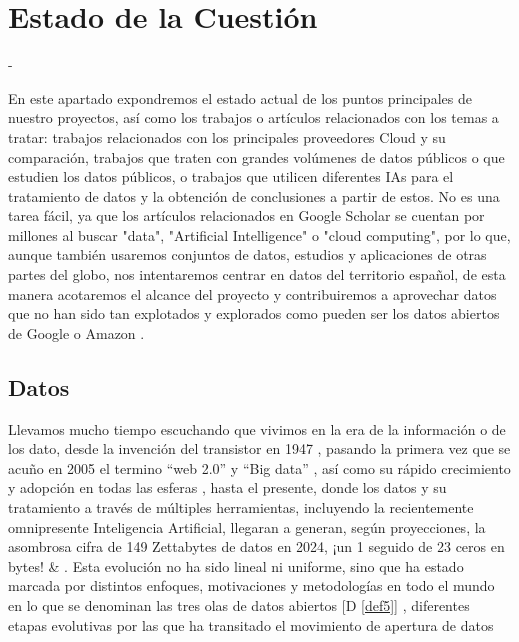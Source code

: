 \chapter{Estado de la Cuestión}
\label{cap:estadoDeLaCuestion}


-

En este apartado expondremos el estado actual de los puntos principales de nuestro proyectos, así como los trabajos o artículos relacionados con los temas a tratar: trabajos relacionados con los principales proveedores Cloud y su comparación, trabajos que traten con grandes volúmenes de datos públicos o que estudien los datos públicos, o trabajos que utilicen diferentes IAs para el tratamiento de datos y la obtención de conclusiones a partir de estos. No es una tarea fácil, ya que los artículos relacionados en Google Scholar se cuentan por millones al buscar "data", "Artificial Intelligence" o "cloud computing", por lo que, aunque también usaremos conjuntos de datos, estudios y aplicaciones de otras partes del globo, nos intentaremos centrar en datos del territorio español, de esta manera acotaremos el alcance del proyecto y contribuiremos a aprovechar datos que no han sido tan explotados y explorados como pueden ser los datos abiertos de Google \citep{googleDataCommon} o Amazon \citep{AWSDataCommon}. 

\section{Datos}
\label{sec:EstudiosDatos}

Llevamos mucho tiempo escuchando que vivimos en la era de la información o de los dato, desde la invención del transistor en 1947 \citep{wikiInformationAge}, pasando la primera vez que se acuño en 2005 el termino ``web 2.0''  y ``Big data''  \citep{HistoryOfBigData}, así como su rápido crecimiento y adopción en todas las esferas \citep{brown2011you}, hasta el presente, donde los datos y su tratamiento a través de múltiples herramientas, incluyendo la recientemente omnipresente Inteligencia Artificial, llegaran a generan, según proyecciones, la asombrosa cifra de 149 Zettabytes de datos en 2024, ¡un 1 seguido de 23 ceros en bytes! \citep{BigDataStatista} \& \citep{BigDataStadisticsMarket}. Esta evolución no ha sido lineal ni uniforme, sino que ha estado marcada por distintos enfoques, motivaciones y metodologías en todo el mundo en lo que se denominan las tres olas de datos abiertos [D \ref{def5}] , diferentes etapas evolutivas por las que ha transitado el movimiento de apertura de datos

